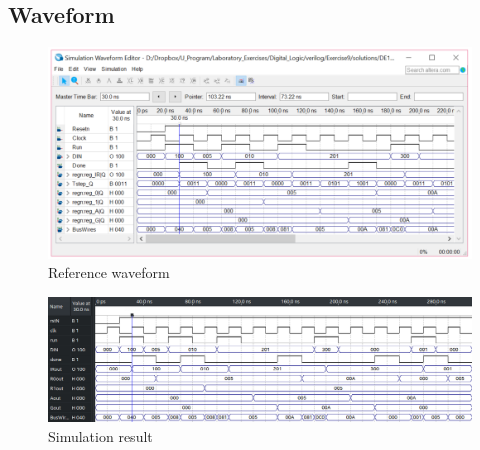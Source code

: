 \documentclass[13pt,a4paper]{report}
\begin{document}
\subsection{Waveform}
\begin{figure}[H]
\centering
\includegraphics[scale=0.4]{images/Exc1_waveform_ref.png}
\caption*{Reference waveform}
\end{figure}

\begin{figure}[H]
\centering
\includegraphics[scale=0.55]{images/Exc1_waveform.png}
\caption*{Simulation result}
\end{figure}

\newpage
\end{document}
